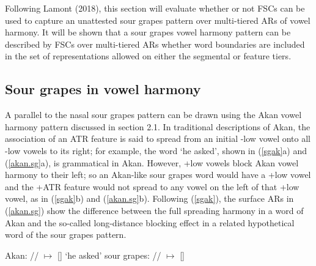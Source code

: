 \documentclass[,doc,floatsintext]{apa6}
\theoremstyle{definition}
\theoremstyle{definition}
\theoremstyle{definition}
\theoremstyle{remark}
\begin{document}
Following Lamont (2018), this section will evaluate whether or not FSCs
can be used to capture an unattested sour grapes pattern over
multi-tiered ARs of vowel harmony. It will be shown that a sour grapes
vowel harmony pattern can be described by FSCs over multi-tiered ARs
whether word boundaries are included in the set of representations
allowed on either the segmental or feature tiers.

\subsection{Sour grapes in vowel
harmony}\label{sour-grapes-in-vowel-harmony}

A parallel to the nasal sour grapes pattern can be drawn using the Akan
vowel harmony pattern discussed in section 2.1. In traditional
descriptions of Akan, the association of an ATR feature is said to
spread from an initial -low vowel onto all -low vowels to its right; for
example, the word \emph{} `he asked', shown in
(\ref{sgak}a) and (\ref{akan.sg}a), is grammatical in Akan. However,
+low vowels block Akan vowel harmony to their left; so an Akan-like sour
grapes word would have a +low vowel and the +ATR feature would not
spread to any vowel on the left of that +low vowel, as in (\ref{sgak}b)
and (\ref{akan.sg}b). Following (\ref{sgak}), the surface ARs in
(\ref{akan.sg}) show the difference between the full spreading harmony
in a word of Akan and the so-called long-distance blocking effect in a
related hypothetical word of the sour grapes pattern.

\begin{exe}
\label{sgak} 
\begin{xlist}
  \ex Akan: // $\mapsto$ [] `he asked'
  \ex sour grapes: // $\mapsto$ []
\end{xlist}
\end{exe}
\end{document}
